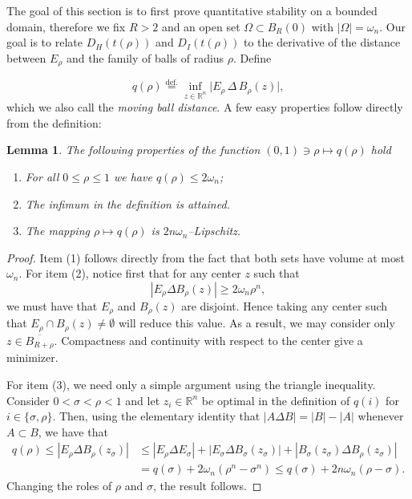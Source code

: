 \documentclass[11pt]{amsart}
\newcommand{\lemmname}{Lemma}
\theoremstyle{plain}
\newtheorem{lemma}[theorem]{\lemmname}
\theoremstyle{definition}
\newcommand{\eqdef}{\overset{\text{def.}}{=}}
\begin{document}
  The goal of this section is to first prove quantitative stability on a bounded domain, therefore we fix $R>2$ and an open set $\Omega\subset B_R(0)$ with $|\Omega|=\omega_n$. Our goal is to relate $D_H(t(\rho))$ and $D_I(t(\rho))$ to the derivative of the distance between $E_\rho$ and the family of balls of radius $\rho$. Define

 \begin{equation}\label{eq.moving_ball_distance}
  q(\rho)\eqdef\inf_{z\in\mathbb{R}^n}\bigl|E_\rho\,\Delta\,B_\rho(z)\bigr|,
\end{equation}
which we also call the \textit{moving ball distance}. A few easy properties follow directly from the definition:

\begin{lemma}\label{lemma.moving_ball_properties}
  The following properties of the function $(0,1) \ni \rho \mapsto q(\rho)$ hold
  \begin{enumerate}
    \item For all $0\le\rho\le 1$ we have $q(\rho)\le 2\omega_n$;
    \item The infimum in the definition is attained.
    \item The mapping $\rho \mapsto q(\rho)$ is $2n\omega_n$--Lipschitz.
  \end{enumerate}
\end{lemma}
\begin{proof}
  Item (1) follows directly from the fact that both sets have volume at most $\omega_n$. For item (2), notice first that for any center $z$ such that
  \[
    |E_\rho \Delta B_\rho(z)| \ge 2 \omega_n\rho^n, 
  \]
  we must have that $E_\rho$ and $B_\rho(z)$ are disjoint. Hence taking any center such that $E_\rho \cap B_\rho(z) \neq \emptyset$ will reduce this value. As a result, we may consider only $z \in \overline{B_{R + \rho}}$. Compactness and continuity with respect to the center give a minimizer.

  For item (3), we need only a simple argument using the triangle inequality. Consider $0 < \sigma < \rho < 1$ and let $z_i \in \mathbb{R}^n$ be optimal in the definition of $q(i)$ for $i \in \{\sigma, \rho\}$.
  Then, using the elementary identity that $|A \Delta B| = |B| - |A|$ whenever $A \subset B$, we have that
  \begin{align*}
    q(\rho) \le
    |E_\rho \Delta B_\rho(z_\sigma)|
    &\le
    |E_\rho \Delta E_\sigma|
    +
    |E_\sigma \Delta B_\sigma(z_\sigma)|
    +
    |B_\sigma(z_\sigma) \Delta B_\rho(z_\sigma)| \\
    &=
    q(\sigma) + 2 \omega_n(\rho^n - \sigma^n)
    \le
     q(\sigma) + 2 n \omega_n(\rho - \sigma).
  \end{align*}
  Changing the roles of $\rho$ and $\sigma$, the result follows.
\end{proof}
\end{document}
